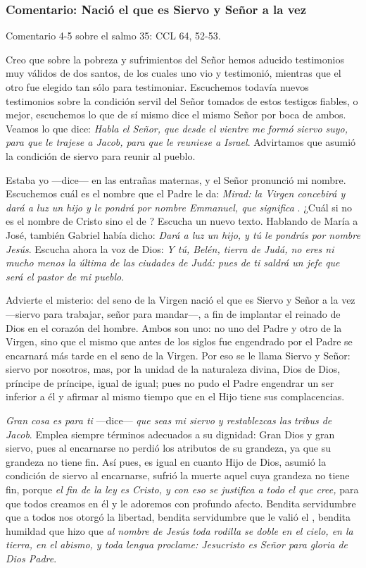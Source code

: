 \subsubsection{Comentario: Nació el que es Siervo y Señor a la vez}

Comentario 4-5 sobre el salmo 35: CCL 64, 52-53.

Creo que sobre la pobreza y sufrimientos del Señor hemos aducido testimonios muy válidos de dos santos, de los cuales uno vio y testimonió, mientras que el otro fue elegido tan sólo para testimoniar. Escuchemos todavía nuevos testimonios sobre la condición servil del Señor tomados de estos testigos fiables, o mejor, escuchemos lo que de sí mismo dice el mismo Señor por boca de ambos. Veamos lo que dice: \emph{Habla el Señor, que desde el vientre me formó siervo suyo, para que le trajese a Jacob, para que le reuniese a Israel}. Advirtamos que asumió la condición de siervo para reunir al pueblo.

Estaba yo ---dice--- en las entrañas maternas, y el Señor pronunció mi nombre. Escuchemos cuál es el nombre que el Padre le da: \emph{Mirad: la Virgen concebirá y dará a luz un hijo y le pondrá por nombre Emmanuel, que significa }. ¿Cuál si no es el nombre de Cristo sino el de ? Escucha un nuevo texto. Hablando de María a José, también Gabriel había dicho: \emph{Dará a luz un hijo, y tú le pondrás por nombre Jesús}. Escucha ahora la voz de Dios: \emph{Y tú, Belén, tierra de Judá, no eres ni mucho menos la última de las ciudades de Judá: pues de ti saldrá un jefe que será el pastor de mi pueblo}.

Advierte el misterio: del seno de la Virgen nació el que es Siervo y Señor a la vez ---siervo para trabajar, señor para mandar---, a fin de implantar el reinado de Dios en el corazón del hombre. Ambos son uno: no uno del Padre y otro de la Virgen, sino que el mismo que antes de los siglos fue engendrado por el Padre se encarnará más tarde en el seno de la Virgen. Por eso se le llama Siervo y Señor: siervo por nosotros, mas, por la unidad de la naturaleza divina, Dios de Dios, príncipe de príncipe, igual de igual; pues no pudo el Padre engendrar un ser inferior a él y afirmar al mismo tiempo que en el Hijo tiene sus complacencias.

\emph{Gran cosa es para ti} ---dice--- \emph{que seas mi siervo y restablezcas las tribus de Jacob}. Emplea siempre términos adecuados a su dignidad: Gran Dios y gran siervo, pues al encarnarse no perdió los atributos de su grandeza, ya que su grandeza no tiene fin. Así pues, es igual en cuanto Hijo de Dios, asumió la condición de siervo al encarnarse, sufrió la muerte aquel cuya grandeza no tiene fin, porque \emph{el fin de la ley es Cristo, y con eso se justifica a todo el que cree,} para que todos creamos en él y le adoremos con profundo afecto. Bendita servidumbre que a todos nos otorgó la libertad, bendita servidumbre que le valió el , bendita humildad que hizo que \emph{al nombre de Jesús toda rodilla se doble en el cielo, en la tierra, en el abismo, y toda lengua proclame: Jesucristo es Señor para gloria de Dios Padre}.

